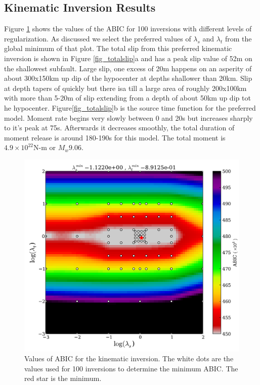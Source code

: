 \subsection{Kinematic Inversion Results}
Figure \ref{fig_ABIC} shows the values of the ABIC for 100 inversions with different levels of regularization. As discussed we select the preferred values of $\lambda_s$ and $\lambda_t$ from the global minimum of that plot. The total slip from this preferred kinematic inversion is shown in Figure \ref{fig_totalslip}a and has a peak slip value of 52m on the shallowest subfault. Large slip, one excess of 20m happens on an asperity of about 300x150km up dip of the hypocenter at depths shallower than 20km. Slip at depth tapers of quickly but there isa till a large area of roughly 200x100km with more than 5-20m of slip extending from a depth of about 50km up dip tot he hypocenter. Figure\ref{fig_totalslip}b is the source time function for the preferred model. Moment rate begins very slowly between 0 and 20s but increases sharply to it's peak at 75s. Afterwards it decreases smoothly, the total duration of moment release is around 180-190s for this model. The total moment is $4.9\times10^{22}\textrm{N-m}$ or $M_w9.06$.
\begin{figure}[!ht] 
  \centering
  \includegraphics[width=0.85\linewidth]{./figures/ch4/ABIC.pdf}
    \caption[ABIC values for kinematic inversion]{Values of ABIC for the kinematic inversion. The white dots are the values used for 100 inversions to determine the minimum ABIC. The red star is the minimum.}
  \label{fig_ABIC}
\end{figure}

